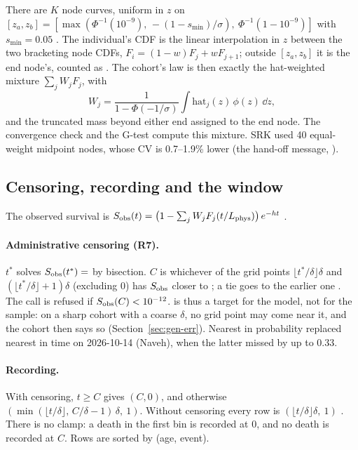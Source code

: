 There are $K$ node curves, uniform in $z$ on
$[z_a,z_b]=[\max(\Phi^{-1}(10^{-9}),\,-(1-s_{\min})/\sigma),\ \Phi^{-1}(1-10^{-9})]$ with $s_{\min}=0.05$
. The individual's CDF is the linear interpolation in $z$ between the two bracketing
node CDFs, $F_i=(1-w)F_j+wF_{j+1}$; outside $[z_a,z_b]$ it is the end node's, counted as 
. The cohort's law is then exactly the hat-weighted mixture
$\sum_jW_jF_j$, with
\begin{equation}
  W_j=\frac{1}{1-\Phi(-1/\sigma)}\int\mathrm{hat}_j(z)\,\phi(z)\,\dd z,
\end{equation}
and the truncated mass beyond either end assigned to the end node. The convergence check and the G-test compute
this mixture. SRK used 40 equal-weight midpoint nodes, whose CV is 0.7--1.9\% lower (the hand-off message,
).

\subsection{Censoring, recording and the window}\label{sec:gen-obs}

The observed survival is $S_{\rm obs}(t)=\bigl(1-\sum_jW_jF_j(t/L_{\rm phys})\bigr)\,e^{-ht}$
.

\paragraph{Administrative censoring (R7).} $t^*$ solves $S_{\rm obs}(t^*)=$  by bisection. $C$
is whichever of the grid points $\lfloor t^*/\delta\rfloor\delta$ and $(\lfloor t^*/\delta\rfloor+1)\delta$ (excluding
0) has $S_{\rm obs}$ closer to ; a tie goes to the earlier one
. The call is refused if $S_{\rm obs}(C)<10^{-12}$.  is thus a
target for the model, not for the sample: on a sharp cohort with a coarse $\delta$, no grid point may come near it,
and the cohort then says so (Section~\ref{sec:gen-err}). Nearest in probability replaced nearest in time on
2026-10-14 (Naveh), when the latter missed by up to 0.33.

\paragraph{Recording.} With censoring, $t\ge C$ gives $(C,0)$, and otherwise
$(\min(\lfloor t/\delta\rfloor,\,C/\delta-1)\,\delta,\ 1)$. Without censoring every row is
$(\lfloor t/\delta\rfloor\delta,\ 1)$ . There is no clamp: a death in the first bin is
recorded at 0, and no death is recorded at $C$. Rows are sorted by (age, event).

